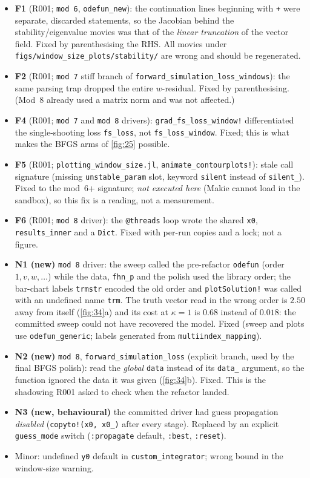 \documentclass[10pt]{article}
\begin{document}
\begin{itemize}[leftmargin=1.4em, itemsep=1pt]
\item \textbf{F1} (R001; \texttt{mod 6}, \texttt{odefun\_new}): the continuation lines beginning with \texttt{+} were separate, discarded statements, so the Jacobian behind the stability/eigenvalue movies was that of the \emph{linear truncation} of the vector field. Fixed by parenthesising the RHS. All movies under \texttt{figs/window\_size\_plots/stability/} are wrong and should be regenerated.
\item \textbf{F2} (R001; \texttt{mod 7} stiff branch of \texttt{forward\_simulation\_loss\_windows}): the same parsing trap dropped the entire $w$-residual. Fixed by parenthesising. (Mod~8 already used a matrix norm and was not affected.)
\item \textbf{F4} (R001; \texttt{mod 7} and \texttt{mod 8} drivers): \texttt{grad\_fs\_loss\_window!} differentiated the single-shooting loss \texttt{fs\_loss}, not \texttt{fs\_loss\_window}. Fixed; this is what makes the BFGS arms of \ref{fig:25} possible.
\item \textbf{F5} (R001; \texttt{plotting\_window\_size.jl}, \texttt{animate\_contourplots!}): stale call signature (missing \texttt{unstable\_param} slot, keyword \texttt{silent} instead of \texttt{silent\_}). Fixed to the mod~6+ signature; \emph{not executed here} (Makie cannot load in the sandbox), so this fix is a reading, not a measurement.
\item \textbf{F6} (R001; \texttt{mod 8} driver): the \texttt{@threads} loop wrote the shared \texttt{x0}, \texttt{results\_inner} and a \texttt{Dict}. Fixed with per-run copies and a lock; not a figure.
\item \textbf{N1 (new)} \texttt{mod 8} driver: the sweep called the pre-refactor \texttt{odefun} (order $1,v,w,\dots$) while the data, \texttt{fhn\_p} and the polish used the library order; the bar-chart labels \texttt{trmstr} encoded the old order and \texttt{plotSolution!} was called with an undefined name \texttt{trm}. The truth vector read in the wrong order is $2.50$ away from itself (\ref{fig:34}a) and its cost at $\kappa=1$ is $0.68$ instead of $0.018$: the committed sweep could not have recovered the model. Fixed (sweep and plots use \texttt{odefun\_generic}; labels generated from \texttt{multiindex\_mapping}).
\item \textbf{N2 (new)} \texttt{mod 8}, \texttt{forward\_simulation\_loss} (explicit branch, used by the final BFGS polish): read the \emph{global} \texttt{data} instead of its \texttt{data\_} argument, so the function ignored the data it was given (\ref{fig:34}b). Fixed. This is the shadowing R001 asked to check when the refactor landed.
\item \textbf{N3 (new, behavioural)} the committed driver had guess propagation \emph{disabled} (\texttt{copyto!(x0, x0\_)} after every stage). Replaced by an explicit \texttt{guess\_mode} switch (\texttt{:propagate} default, \texttt{:best}, \texttt{:reset}).
\item Minor: undefined \texttt{y0} default in \texttt{custom\_integrator}; wrong bound in the window-size warning.
\end{itemize}
\end{document}
